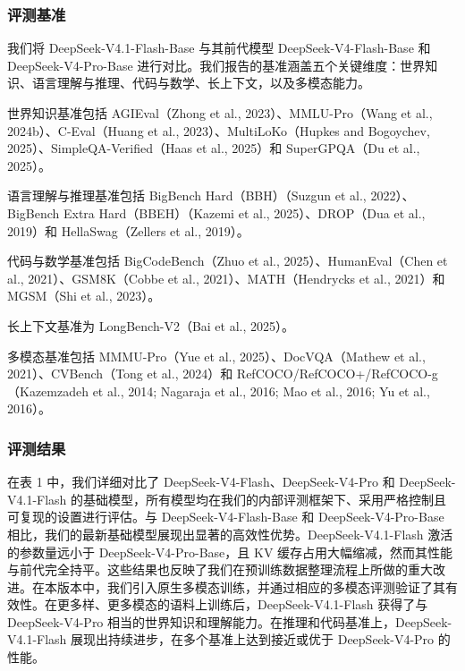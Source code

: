\documentclass[
  10
]{article}
\begin{document}
\subsubsection{评测基准}\label{evaluation-benchmarks}

我们将 DeepSeek-V4.1-Flash-Base 与其前代模型 DeepSeek-V4-Flash-Base 和 DeepSeek-V4-Pro-Base 进行对比。我们报告的基准涵盖五个关键维度：世界知识、语言理解与推理、代码与数学、长上下文，以及多模态能力。

世界知识基准包括 AGIEval（Zhong et al., 2023）、MMLU-Pro（Wang et al., 2024b）、C-Eval（Huang et al., 2023）、MultiLoKo（Hupkes and Bogoychev, 2025）、SimpleQA-Verified（Haas et al., 2025）和 SuperGPQA（Du et al., 2025）。

语言理解与推理基准包括 BigBench Hard（BBH）（Suzgun et al., 2022）、BigBench Extra Hard（BBEH）（Kazemi et al., 2025）、DROP（Dua et al., 2019）和 HellaSwag（Zellers et al., 2019）。

代码与数学基准包括 BigCodeBench（Zhuo et al., 2025）、HumanEval（Chen et al., 2021）、GSM8K（Cobbe et al., 2021）、MATH（Hendrycks et al., 2021）和 MGSM（Shi et al., 2023）。

长上下文基准为 LongBench-V2（Bai et al., 2025）。

多模态基准包括 MMMU-Pro（Yue et al., 2025）、DocVQA（Mathew et al., 2021）、CVBench（Tong et al., 2024）和 RefCOCO/RefCOCO+/RefCOCO-g（Kazemzadeh et al., 2014; Nagaraja et al., 2016; Mao et al., 2016; Yu et al., 2016）。

\subsubsection{评测结果}\label{evaluation-results}

在表 1 中，我们详细对比了 DeepSeek-V4-Flash、DeepSeek-V4-Pro 和 DeepSeek-V4.1-Flash 的基础模型，所有模型均在我们的内部评测框架下、采用严格控制且可复现的设置进行评估。与 DeepSeek-V4-Flash-Base 和 DeepSeek-V4-Pro-Base 相比，我们的最新基础模型展现出显著的高效性优势。DeepSeek-V4.1-Flash 激活的参数量远小于 DeepSeek-V4-Pro-Base，且 KV 缓存占用大幅缩减，然而其性能与前代完全持平。这些结果也反映了我们在预训练数据整理流程上所做的重大改进。在本版本中，我们引入原生多模态训练，并通过相应的多模态评测验证了其有效性。在更多样、更多模态的语料上训练后，DeepSeek-V4.1-Flash 获得了与 DeepSeek-V4-Pro 相当的世界知识和理解能力。在推理和代码基准上，DeepSeek-V4.1-Flash 展现出持续进步，在多个基准上达到接近或优于 DeepSeek-V4-Pro 的性能。
\end{document}
